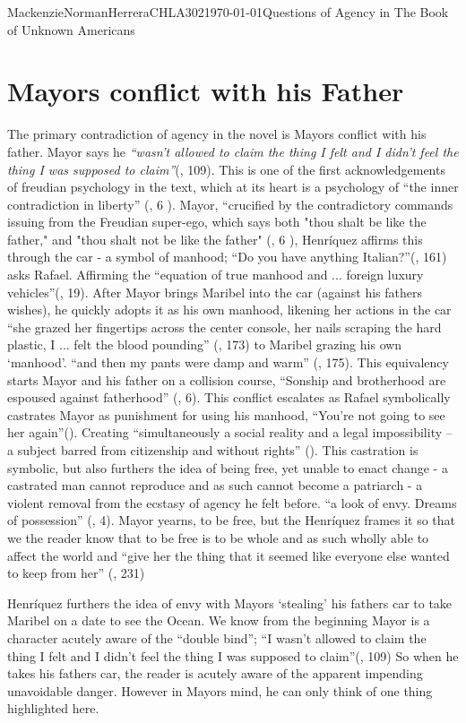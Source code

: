 \documentclass{article}
\begin{document}
\begin{mla}{Mackenzie}{Norman}{Herrera}{CHLA302}{\today}{Questions of Agency in The Book of Unknown Americans}
\section*{Mayors conflict with his Father}

The primary contradiction of agency in the novel is Mayors conflict with his father. Mayor says he 
\textit{``wasn’t allowed to claim the thing I felt and I didn’t feel the thing I was supposed to claim''}(\cite{Henriquez2014-sh}, 109). This is one of the first acknowledgements of freudian psychology in the text, which at its heart is a psychology of ``the inner contradiction in liberty'' (\cite{loves-bdy}, 6 ).
Mayor, ``crucified by the contradictory commands issuing from the Freudian super-ego, which says both "thou shalt be like the father," and "thou shalt not be like the father" (\cite{loves-bdy}, 6 ), Henríquez affirms this through the car - a symbol of manhood; ``Do you have anything Italian?''(\cite{Henriquez2014-sh}, 161) asks Rafael. Affirming the ``equation of  true manhood and ... foreign luxury vehicles''(\cite{Uhlman2015-qx}, 19). After Mayor brings Maribel into the car (against his fathers wishes), he quickly adopts it as his own manhood, likening her actions in the car ``she grazed her fingertips across the center console, her nails scraping the hard plastic, I ... felt the blood pounding'' (\cite{Henriquez2014-sh}, 173) to Maribel grazing his own `manhood'. ``and then my pants were damp and warm'' (\cite{Henriquez2014-sh}, 175). This equivalency starts Mayor and his father on a collision course, ``Sonship and brotherhood are espoused against fatherhood'' (\cite{loves-bdy}, 6). This conflict escalates as Rafael symbolically castrates Mayor as punishment for using his manhood, ``You're not going to see her again''(\cite{Henriquez2014-sh}). Creating  ``simultaneously a social reality and a legal impossibility – a subject barred from citizenship and without rights'' (\cite{Lutes_Travis_2021}). This castration is symbolic, but also furthers the idea of being free, yet unable to enact change - a castrated man cannot reproduce and as such cannot become a patriarch - a violent removal from the ecstasy of agency he felt before. ``a look of envy. Dreams of possession'' (\cite{wretched}, 4). Mayor yearns, to be free, but the Henríquez frames it so that we the reader know that to be free is to be whole and as such wholly able to affect the world and ``give her the thing that it seemed like everyone else wanted to keep from her'' (\cite{Henriquez2014-sh}, 231) 

Henríquez furthers the idea of envy with Mayors `stealing' his fathers car to take Maribel on a date to see the Ocean. We know from the beginning Mayor is a character acutely aware of the ``double bind''; ``I wasn’t allowed to claim the thing I felt and I didn’t feel the thing I was supposed to claim''(\cite{Henriquez2014-sh}, 109)  So when he takes his fathers car, the reader is acutely aware of the apparent impending unavoidable danger. However in Mayors mind, he can only think of one thing highlighted here.


\end{mla}
\end{document}
